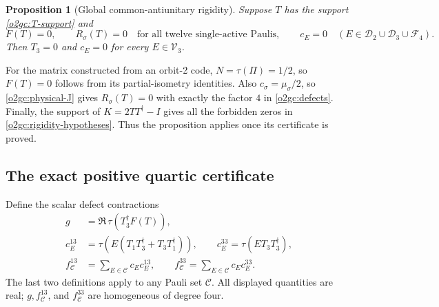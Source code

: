 \documentclass[11pt]{article}
\newtheorem{proposition}[theorem]{Proposition}
\theoremstyle{definition}
\begin{document}
\begin{proposition}[Global common-antiunitary rigidity]
\label{o2gc:prop-rigidity}
Suppose \(T\) has the support \eqref{o2gc:T-support} and
\begin{equation}
 F(T)=0,\qquad R_\sigma(T)=0
 \quad\text{for all twelve single-active Paulis},\qquad
 c_E=0\quad(E\in\mathcal D_2\cup\mathcal D_3\cup\mathcal F_4).
 \label{o2gc:rigidity-hypotheses}
\end{equation}
Then \(T_3=0\) and \(c_E=0\) for every \(E\in\mathcal V_3\).
\end{proposition}

For the matrix constructed from an orbit-2 code,
\(N=\tau(\Pi)=1/2\), so \(F(T)=0\) follows from its partial-isometry
identities. Also \(c_\sigma=\mu_\sigma/2\), so
\eqref{o2gc:physical-J} gives \(R_\sigma(T)=0\) with exactly the
factor \(4\) in \eqref{o2gc:defects}. Finally, the support of
\(K=2TT^\dagger-I\) gives all the forbidden zeros in
\eqref{o2gc:rigidity-hypotheses}. Thus the proposition applies once
its certificate is proved.

\subsection{The exact positive quartic certificate}
\label{o2gc:subsec-certificate}

Define the scalar defect contractions
\begin{align}
 g&=\Re\,\tau(T_3^\dagger F(T)),\nonumber\\
 c_E^{13}&=\tau\!\left(E(T_1T_3^\dagger+T_3T_1^\dagger)\right),
 \qquad c_E^{33}=\tau(ET_3T_3^\dagger),\nonumber\\
 f_{\mathcal C}^{13}&=\sum_{E\in\mathcal C}c_Ec_E^{13},\qquad
 f_{\mathcal C}^{33}=\sum_{E\in\mathcal C}c_Ec_E^{33}.
 \label{o2gc:scalar-contractions}
\end{align}
The last two definitions apply to any Pauli set \(\mathcal C\).
All displayed quantities are real; \(g,f_{\mathcal C}^{13}\), and
\(f_{\mathcal C}^{33}\) are homogeneous of degree four.
\end{document}
